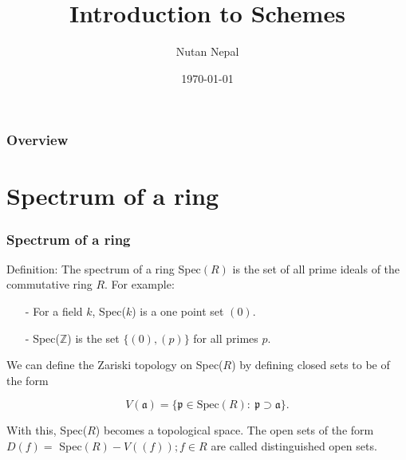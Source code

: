 \documentclass{beamer}
\title[Schemes]{Introduction to Schemes} %
\author{Nutan Nepal} %
\institute[North Carolina State University] %
{
North Carolina State University \\ %
\medskip
\textit{nnepal2@ncsu.edu} %
}
\date{\today} %
\begin{document}
\begin{frame}
\titlepage %
\end{frame}

\begin{frame}
\frametitle{Overview} %
\tableofcontents %
\end{frame}


\section{Spectrum of a ring} %

\begin{frame}
\frametitle{Spectrum of a ring}
Definition: The spectrum of a ring Spec$(R)$ is the set of all prime ideals of
the commutative ring $R$. For example:

\begin{itemize}
    \item[-] For a field $k$, Spec($k$) is a one point set $(0)$.
    \item[-] Spec($\mathbb{Z}$) is the set $\{(0), (p)\}$ for all primes $p$.
\end{itemize}

We can define the Zariski topology on Spec($R$) by defining closed sets to be of the form

$$V(\mathfrak{a}) =
    \{\mathfrak{p}\in \text{Spec}(R):\ \mathfrak{p} \supset \mathfrak{a}\}.$$

With this, Spec($R$) becomes a topological space. The open sets of the form
$D(f)= $ Spec$(R)-V((f)); f\in R$ are called distinguished open sets.

\end{frame}
\end{document}

